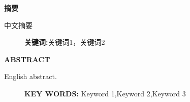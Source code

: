 \begin{center}
   \thispagestyle{empty}
   \fontsize{18pt}{\baselineskip}\bf\textsf{摘\quad 要}
   \vspace{10pt}

\end{center}

\vspace{10pt}

中文摘要

\begin{figure}[b]
   \qquad \textbf{关键词:}关键词1，关键词2
\end{figure}

\newpage

\begin{center}
   \thispagestyle{empty}
   \fontsize{18pt}{\baselineskip}\sf\textbf{ABSTRACT}
   \vspace{10pt}

\end{center}

\vspace{10pt}
\setlength{\parindent}{0em}

English abstract.


\begin{figure}[b]
   \textbf{KEY WORDS:} Keyword 1,\quad Keyword 2,\quad Keyword 3
\end{figure}

\setlength{\parindent}{2em}
